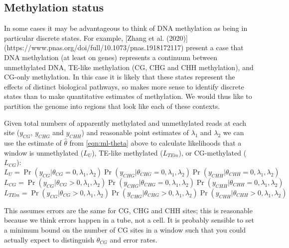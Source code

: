 \documentclass[12pt,longbibliography]{article}
\begin{document}
\subsection{Methylation status}

In some cases it may be advantageous to think of DNA methylation as being in particular discrete states.
For example, [Zhang et al. (2020)](https://www.pnas.org/doi/full/10.1073/pnas.1918172117) present a case that DNA methylation (at least on genes) represents a continuum between unmethylated DNA, TE-like methylation (CG, CHG and CHH methylation), and CG-only methylation.
In this case it is likely that these states represent the effects of distinct biological pathways, so makes more sense to identify discrete states than to make quantitative estimates of methylation.
We would thus like to partition the genome into regions that look like each of these contexts.

Given total numbers of apparently methylated and unmethylated reads at each site ($y_{CG}$, $y_{CHG}$ and $y_{CHH}$) and reasonable point estimates of $\lambda_1$ and $\lambda_2$ we can use the estimate of $\hat{\theta}$ from \ref{eqn:ml-theta} above to calculate likelihoods that a window is unmethylated ($L_U$), TE-like methylated ($L_{TEm}$), or CG-methylated ($L_{CG}$):
\begin{equation}
    \label{eqn:lik-unmethylated}
    L_{U} = 
    \Pr( y_{CG} | \theta_{CG} =0, \lambda_1, \lambda_2)
    \Pr(y_{CHG} | \theta_{CHG}=0, \lambda_1, \lambda_2)
    \Pr(y_{CHH} | \theta_{CHH}=0, \lambda_1, \lambda_2)
\end{equation}
\begin{equation}
    \label{eqn:lik-mCG}
    L_{CG} = 
    \Pr( y_{CG} | \theta_{CG}>0, \lambda_1, \lambda_2)
    \Pr(y_{CHG} | \theta_{CHG}=0, \lambda_1, \lambda_2)
    \Pr(y_{CHH} | \theta_{CHH}=0, \lambda_1, \lambda_2)
\end{equation}
\begin{equation}
    \label{eqn:lik-TEm}
    L_{TEm} = 
    \Pr( y_{CG} | \theta_{CG}>0, \lambda_1, \lambda_2)
    \Pr(y_{CHG} | \theta_{CHG}>0, \lambda_1, \lambda_2)
    \Pr(y_{CHH} | \theta_{CHH}>0, \lambda_1, \lambda_2)
\end{equation}

This assumes errors are the same for CG, CHG and CHH sites; this is reasonable because we think errors happen in a tube, not a cell. It is probably sensible to set a minimum bound on the number of CG sites in a window such that you could actually expect to distinguish $\theta_{CG}$ and error rates.
\end{document}
